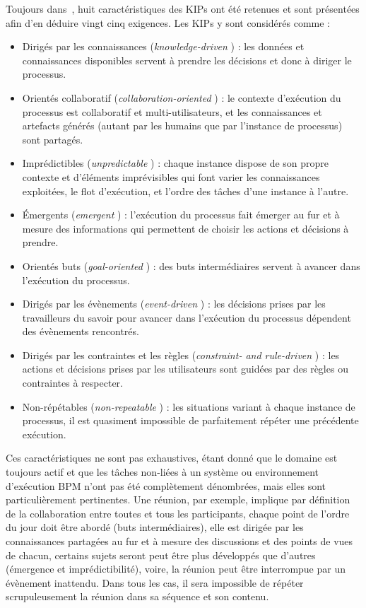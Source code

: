 Toujours dans~\cite{di2015knowledge}, huit caractéristiques des KIPs ont été retenues et sont présentées afin d'en déduire vingt cinq exigences.
Les KIPs y sont considérés comme :
\begin{itemize}
\item Dirigés par les connaissances (\og \textit{knowledge-driven} \fg) : les données et connaissances disponibles servent à prendre les décisions et donc à diriger le processus.
\item Orientés collaboratif (\og \textit{collaboration-oriented} \fg) : le contexte d'exécution du processus est collaboratif et multi-utilisateurs, et les connaissances et artefacts générés (autant par les humains que par l'instance de processus) sont partagés.
\item Imprédictibles (\og \textit{unpredictable} \fg) : chaque instance dispose de son propre contexte et d'éléments imprévisibles qui font varier les connaissances exploitées, le flot d'exécution, et l'ordre des tâches d'une instance à l'autre.
\item Émergents (\og \textit{emergent} \fg) : l'exécution du processus fait émerger au fur et à mesure des informations qui permettent de choisir les actions et décisions à prendre.
\item Orientés buts (\og \textit{goal-oriented} \fg) : des buts intermédiaires servent à avancer dans l'exécution du processus.
\item Dirigés par les évènements (\og \textit{event-driven} \fg) : les décisions prises par les travailleurs du savoir pour avancer dans l'exécution du processus dépendent des évènements rencontrés.
\item Dirigés par les contraintes et les règles (\og \textit{constraint- and rule-driven} \fg) : les actions et décisions prises par les utilisateurs sont guidées par des règles ou contraintes à respecter.
\item Non-répétables (\og \textit{non-repeatable} \fg) : les situations variant à chaque instance de processus, il est quasiment impossible de parfaitement répéter une précédente exécution.
\end{itemize}

\bigskip

Ces caractéristiques ne sont pas exhaustives, étant donné que le domaine est toujours actif et que les tâches non-liées à un système ou environnement d'exécution BPM n'ont pas été complètement dénombrées, mais elles sont particulièrement pertinentes.
Une réunion, par exemple, implique par définition de la collaboration entre toutes et tous les participants, chaque point de l'ordre du jour doit être abordé (buts intermédiaires), elle est dirigée par les connaissances partagées au fur et à mesure des discussions et des points de vues de chacun, certains sujets seront peut être plus développés que d'autres (émergence et imprédictibilité), voire, la réunion peut être interrompue par un évènement inattendu.
Dans tous les cas, il sera impossible de répéter scrupuleusement la réunion dans sa séquence et son contenu.

